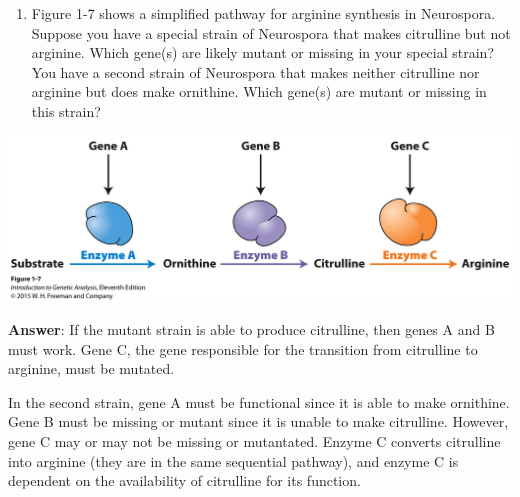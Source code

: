 \documentclass[11pt,]{article}
\providecommand{\tightlist}{%
  \setlength{\itemsep}{0pt}\setlength{\parskip}{0pt}}
\begin{document}
\begin{blackbox}

\begin{enumerate}
\def\labelenumi{\arabic{enumi}.}
\setcounter{enumi}{3}
\tightlist
\item
  Figure 1-7 shows a simplified pathway for arginine synthesis in
  Neurospora. Suppose you have a special strain of Neurospora that makes
  citrulline but not arginine. Which gene(s) are likely mutant or
  missing in your special strain? You have a second strain of Neurospora
  that makes neither citrulline nor arginine but does make ornithine.
  Which gene(s) are mutant or missing in this strain?\\
\end{enumerate}

\begin{center}\includegraphics[width=0.45\linewidth,]{input/figure_01_07} \end{center}

\textbf{Answer}: If the mutant strain is able to produce citrulline,
then genes A and B must work. Gene C, the gene responsible for the
transition from citrulline to arginine, must be mutated.

In the second strain, gene A must be functional since it is able to make
ornithine. Gene B must be missing or mutant since it is unable to make
citrulline. However, gene C may or may not be missing or mutantated.
Enzyme C converts citrulline into arginine (they are in the same
sequential pathway), and enzyme C is dependent on the availability of
citrulline for its function.

\end{blackbox}
\end{document}

